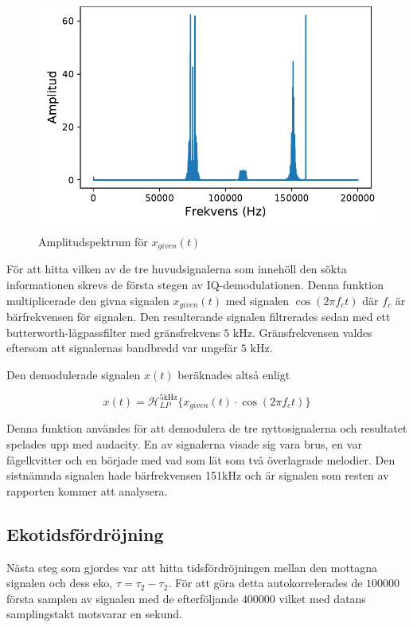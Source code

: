 \documentclass[10pt,twocolumn]{article}
\newcommand{\echodelay}{\tau}
\newcommand{\lpfilter}{\mathcal{H}_{LP}^{5 \text{kHz}}}
\begin{document}
\begin{figure}[h]
    \centering
    \includegraphics[width=0.85\linewidth]{spectrum.pdf}
    \caption{Amplitudspektrum för $x_{given}(t)$}
    \label{fig:spectrum}
\end{figure}

För att hitta vilken av de tre huvudsignalerna som innehöll den sökta informationen
skrevs de första stegen av IQ-demodulationen. Denna
funktion multiplicerade den givna signalen $x_{given}(t)$ med signalen $\cos(2\pi f_c t)$ där $f_c$
är bärfrekvensen för signalen. Den resulterande signalen filtrerades sedan med ett 
butterworth-lågpassfilter med gränsfrekvens $5 \text{ kHz}$. Gränsfrekvensen valdes eftersom
att signalernas bandbredd var ungefär $5 \text{ kHz}$.

Den demodulerade signalen $x(t)$ beräknades altså enligt

\begin{equation}
    x(t) = \lpfilter\{ x_{given}(t) \cdot \cos(2\pi f_c t) \}
\end{equation}




Denna funktion användes för att demodulera de tre nyttosignalerna och resultatet spelades
upp med audacity. En av signalerna visade sig vara brus, en var fågelkvitter och en började
med vad som lät som två överlagrade melodier. Den sistnämnda signalen hade bärfrekvensen 151kHz
och är signalen som resten av rapporten kommer att analysera.




\subsection{Ekotidsfördröjning}
Nästa steg som gjordes var att hitta tidsfördröjningen
mellan den mottagna signalen och dess eko, $\echodelay=\tau_2-\tau_2$.
För att göra detta autokorrelerades de $100000$ första samplen
av signalen med de efterföljande $400000$ vilket med datans samplingstakt motsvarar en sekund.
\end{document}
